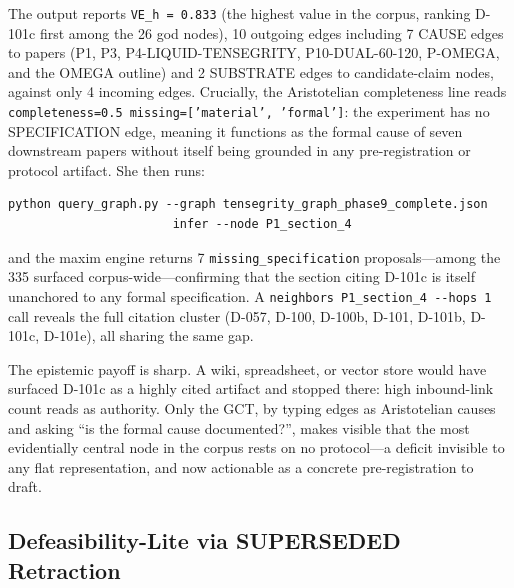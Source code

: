\documentclass{iosart2x}
\begin{document}
\noindent The output reports \texttt{VE\_h = 0.833} (the highest value in the corpus, ranking D-101c first among the 26 god nodes), 10 outgoing edges including 7 CAUSE edges to papers (P1, P3, P4-LIQUID-TENSEGRITY, P10-DUAL-60-120, P-OMEGA, and the OMEGA outline) and 2 SUBSTRATE edges to candidate-claim nodes, against only 4 incoming edges. Crucially, the Aristotelian completeness line reads \texttt{completeness=0.5 missing=['material', 'formal']}: the experiment has no SPECIFICATION edge, meaning it functions as the formal cause of seven downstream papers without itself being grounded in any pre-registration or protocol artifact. She then runs:

\begin{verbatim}
python query_graph.py --graph tensegrity_graph_phase9_complete.json
                       infer --node P1_section_4
\end{verbatim}

\noindent and the maxim engine returns 7 \texttt{missing\_specification} proposals---among the 335 surfaced corpus-wide---confirming that the section citing D-101c is itself unanchored to any formal specification. A \texttt{neighbors P1\_section\_4 -{}-hops 1} call reveals the full citation cluster (D-057, D-100, D-100b, D-101, D-101b, D-101c, D-101e), all sharing the same gap.

The epistemic payoff is sharp. A wiki, spreadsheet, or vector store would have surfaced D-101c as a highly cited artifact and stopped there: high inbound-link count reads as authority. Only the GCT, by typing edges as Aristotelian causes and asking ``is the formal cause documented?'', makes visible that the most evidentially central node in the corpus rests on no protocol---a deficit invisible to any flat representation, and now actionable as a concrete pre-registration to draft.

\subsection{Defeasibility-Lite via SUPERSEDED Retraction}
\label{sec:superseded}
\end{document}
